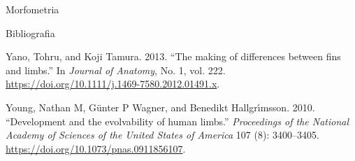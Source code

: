 \documentclass[
  ignorenonframetext,
]{beamer}
\newlength{\cslhangindent}
\newenvironment{CSLReferences}[2] %
 {\begin{list}{}{%
  \setlength{\itemindent}{0pt}
  \setlength{\leftmargin}{0pt}
  \setlength{\parsep}{0pt}
  \ifodd #1
   \setlength{\leftmargin}{\cslhangindent}
   \setlength{\itemindent}{-1\cslhangindent}
  \fi
  \setlength{\itemsep}{#2\baselineskip}}}
 {\end{list}}
\begin{document}
\begin{frame}{Morfometria}
\begin{block}{Bibliografia}
\begin{CSLReferences}{1}{1}
Yano, Tohru, and Koji Tamura. 2013. {``{The making of differences
between fins and limbs}.''} In \emph{Journal of Anatomy}, No. 1, vol.
222. \url{https://doi.org/10.1111/j.1469-7580.2012.01491.x}.

Young, Nathan M, Günter P Wagner, and Benedikt Hallgrı́msson. 2010.
{``{Development and the evolvability of human limbs}.''}
\emph{Proceedings of the National Academy of Sciences of the United
States of America} 107 (8): 3400--3405.
\url{https://doi.org/10.1073/pnas.0911856107}.

\end{CSLReferences}
\end{block}
\end{frame}
\end{document}
